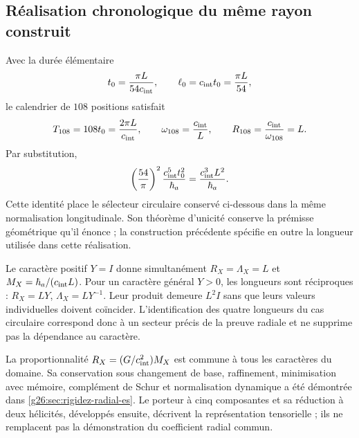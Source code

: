 \subsection{Réalisation chronologique du même rayon construit}
\label{cr28:sec:radial-clock} Avec la durée élémentaire
\begin{equation}
 t_0=\frac{\pi L}{54c_{\rm int}},
 \qquad \ell_0=c_{\rm int}t_0=\frac{\pi L}{54},
 \label{cr28:eq:clock-from-length}
\end{equation}
le calendrier de \(108\) positions satisfait
\[
 T_{108}=108t_0=\frac{2\pi L}{c_{\rm int}},\qquad
 \omega_{108}=\frac{c_{\rm int}}{L},\qquad
 R_{108}=\frac{c_{\rm int}}{\omega_{108}}=L.
\]
Par substitution,
\begin{equation}
 \left(\frac{54}{\pi}\right)^2
 \frac{c_{\rm int}^5t_0^2}{\hbar_a}
 =\frac{c_{\rm int}^3L^2}{\hbar_a}.
 \label{cr28:eq:circular-radial-agreement}
\end{equation}
Cette identité place le sélecteur circulaire conservé ci-dessous dans la même normalisation longitudinale. Son théorème d'unicité conserve la prémisse géométrique qu'il énonce ; la construction précédente spécifie en outre la longueur utilisée dans cette réalisation.

Le caractère positif \(Y=I\) donne simultanément \(R_X=\Lambda_X=L\) et \(M_X=\hbar_a/(c_{\rm int}L)\). Pour un caractère général \(Y>0\), les longueurs sont réciproques : \(R_X=LY\), \(\Lambda_X=LY^{-1}\). Leur produit demeure \(L^2I\) sans que leurs valeurs individuelles doivent coïncider. L'identification des quatre longueurs du cas circulaire correspond donc à un secteur précis de la preuve radiale et ne supprime pas la dépendance au caractère.

La proportionnalité \(R_X=(G/c_{\rm int}^{2})M_X\) est commune à tous les caractères du domaine. Sa conservation sous changement de base, raffinement, minimisation avec mémoire, complément de Schur et normalisation dynamique a été démontrée dans \cref{g26:sec:rigidez-radial-es}. Le porteur à cinq composantes et sa réduction à deux hélicités, développés ensuite, décrivent la représentation tensorielle ; ils ne remplacent pas la démonstration du coefficient radial commun.
